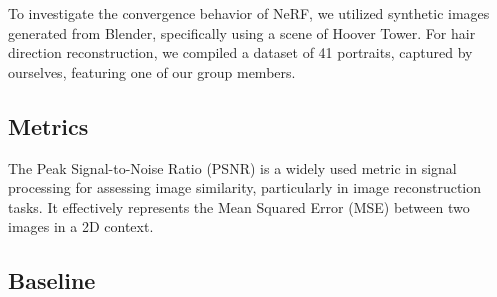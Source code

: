 \documentclass[12pt]{article}
\begin{document}
  To investigate the convergence behavior of NeRF, we utilized synthetic images generated from Blender, specifically using a scene of Hoover Tower. For hair direction reconstruction, we compiled a dataset of 41 portraits, captured by ourselves, featuring one of our group members.

  \subsection{Metrics}

  The Peak Signal-to-Noise Ratio (PSNR) is a widely used metric in signal processing for assessing image similarity, particularly in image reconstruction tasks. It effectively represents the Mean Squared Error (MSE) between two images in a 2D context.

  \subsection{Baseline}
\end{document}
